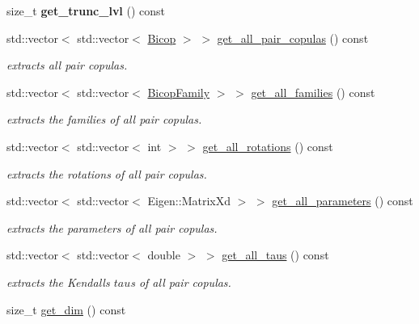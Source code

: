 \begin{DoxyCompactItemize}
size\+\_\+t {\bfseries get\+\_\+trunc\+\_\+lvl} () const
\item 
std\+::vector$<$ std\+::vector$<$ \hyperlink{classvinecopulib_1_1_bicop}{Bicop} $>$ $>$ \hyperlink{classvinecopulib_1_1_vinecop_a5f1c76c0fd97ea586b182f7996034e86}{get\+\_\+all\+\_\+pair\+\_\+copulas} () const
\begin{DoxyCompactList}\small\item\em extracts all pair copulas. \end{DoxyCompactList}\item 
std\+::vector$<$ std\+::vector$<$ \hyperlink{namespacevinecopulib_a42e95cc06d33896199caab0c11ad44f3}{Bicop\+Family} $>$ $>$ \hyperlink{classvinecopulib_1_1_vinecop_ab8a6a5d111b80788955438e1630f04c9}{get\+\_\+all\+\_\+families} () const
\begin{DoxyCompactList}\small\item\em extracts the families of all pair copulas. \end{DoxyCompactList}\item 
std\+::vector$<$ std\+::vector$<$ int $>$ $>$ \hyperlink{classvinecopulib_1_1_vinecop_a45dd56984cf7395494ed3fab75c62a1e}{get\+\_\+all\+\_\+rotations} () const
\begin{DoxyCompactList}\small\item\em extracts the rotations of all pair copulas. \end{DoxyCompactList}\item 
std\+::vector$<$ std\+::vector$<$ Eigen\+::\+Matrix\+Xd $>$ $>$ \hyperlink{classvinecopulib_1_1_vinecop_adbd6c2e57666bcec101bc2cc8846c78b}{get\+\_\+all\+\_\+parameters} () const
\begin{DoxyCompactList}\small\item\em extracts the parameters of all pair copulas. \end{DoxyCompactList}\item 
std\+::vector$<$ std\+::vector$<$ double $>$ $>$ \hyperlink{classvinecopulib_1_1_vinecop_ac271e64e1b2dd16f8b5ccaecf3f03e96}{get\+\_\+all\+\_\+taus} () const
\begin{DoxyCompactList}\small\item\em extracts the Kendall\textquotesingle{}s $ tau $s of all pair copulas. \end{DoxyCompactList}\item 
\mbox{\label{classvinecopulib_1_1_vinecop_a27e9d72fa28b4d167dde9ae9205ec995}} 
size\+\_\+t \hyperlink{classvinecopulib_1_1_vinecop_a27e9d72fa28b4d167dde9ae9205ec995}{get\+\_\+dim} () const

\end{DoxyCompactItemize}
